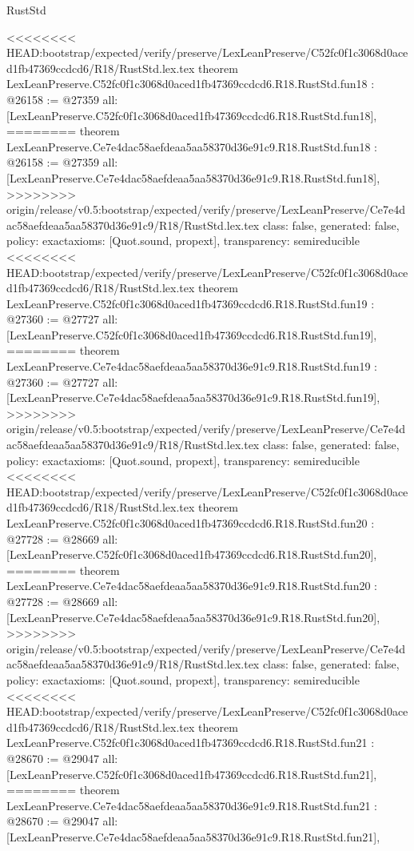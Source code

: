 \begin{lexlean}{RustStd}
\begin{coremodule}
{\begin{coremodule}
{{{{{{{{{{{{{{{{{{{{{}
<<<<<<<< HEAD:bootstrap/expected/verify/preserve/LexLeanPreserve/C52fc0f1c3068d0aced1fb47369ccdcd6/R18/RustStd.lex.tex
theorem LexLeanPreserve.C52fc0f1c3068d0aced1fb47369ccdcd6.R18.RustStd.fun18 : @26158 := @27359 {
  all: [LexLeanPreserve.C52fc0f1c3068d0aced1fb47369ccdcd6.R18.RustStd.fun18],
========
theorem LexLeanPreserve.Ce7e4dac58aefdeaa5aa58370d36e91c9.R18.RustStd.fun18 : @26158 := @27359 {
  all: [LexLeanPreserve.Ce7e4dac58aefdeaa5aa58370d36e91c9.R18.RustStd.fun18],
>>>>>>>> origin/release/v0.5:bootstrap/expected/verify/preserve/LexLeanPreserve/Ce7e4dac58aefdeaa5aa58370d36e91c9/R18/RustStd.lex.tex
  class: false,
  generated: false,
  policy: exact{axioms: [Quot.sound, propext]},
  transparency: semireducible
}
<<<<<<<< HEAD:bootstrap/expected/verify/preserve/LexLeanPreserve/C52fc0f1c3068d0aced1fb47369ccdcd6/R18/RustStd.lex.tex
theorem LexLeanPreserve.C52fc0f1c3068d0aced1fb47369ccdcd6.R18.RustStd.fun19 : @27360 := @27727 {
  all: [LexLeanPreserve.C52fc0f1c3068d0aced1fb47369ccdcd6.R18.RustStd.fun19],
========
theorem LexLeanPreserve.Ce7e4dac58aefdeaa5aa58370d36e91c9.R18.RustStd.fun19 : @27360 := @27727 {
  all: [LexLeanPreserve.Ce7e4dac58aefdeaa5aa58370d36e91c9.R18.RustStd.fun19],
>>>>>>>> origin/release/v0.5:bootstrap/expected/verify/preserve/LexLeanPreserve/Ce7e4dac58aefdeaa5aa58370d36e91c9/R18/RustStd.lex.tex
  class: false,
  generated: false,
  policy: exact{axioms: [Quot.sound, propext]},
  transparency: semireducible
}
<<<<<<<< HEAD:bootstrap/expected/verify/preserve/LexLeanPreserve/C52fc0f1c3068d0aced1fb47369ccdcd6/R18/RustStd.lex.tex
theorem LexLeanPreserve.C52fc0f1c3068d0aced1fb47369ccdcd6.R18.RustStd.fun20 : @27728 := @28669 {
  all: [LexLeanPreserve.C52fc0f1c3068d0aced1fb47369ccdcd6.R18.RustStd.fun20],
========
theorem LexLeanPreserve.Ce7e4dac58aefdeaa5aa58370d36e91c9.R18.RustStd.fun20 : @27728 := @28669 {
  all: [LexLeanPreserve.Ce7e4dac58aefdeaa5aa58370d36e91c9.R18.RustStd.fun20],
>>>>>>>> origin/release/v0.5:bootstrap/expected/verify/preserve/LexLeanPreserve/Ce7e4dac58aefdeaa5aa58370d36e91c9/R18/RustStd.lex.tex
  class: false,
  generated: false,
  policy: exact{axioms: [Quot.sound, propext]},
  transparency: semireducible
}
<<<<<<<< HEAD:bootstrap/expected/verify/preserve/LexLeanPreserve/C52fc0f1c3068d0aced1fb47369ccdcd6/R18/RustStd.lex.tex
theorem LexLeanPreserve.C52fc0f1c3068d0aced1fb47369ccdcd6.R18.RustStd.fun21 : @28670 := @29047 {
  all: [LexLeanPreserve.C52fc0f1c3068d0aced1fb47369ccdcd6.R18.RustStd.fun21],
========
theorem LexLeanPreserve.Ce7e4dac58aefdeaa5aa58370d36e91c9.R18.RustStd.fun21 : @28670 := @29047 {
  all: [LexLeanPreserve.Ce7e4dac58aefdeaa5aa58370d36e91c9.R18.RustStd.fun21],
}}}}}}}}}}}}}}}}}}}}}}}}}
\end{coremodule}}
\end{coremodule}
\end{lexlean}
